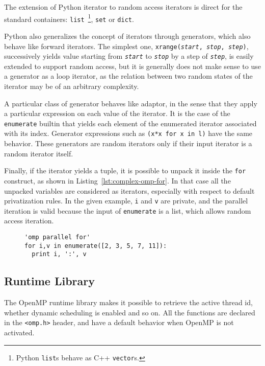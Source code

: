 \documentclass{llncs}
\begin{document}
The extension of Python iterator to random access iterators is direct for the
standard containers: \texttt{list}~\footnote{Python \texttt{list}s behave as C++
\texttt{vector}s.}, \texttt{set} or \texttt{dict}.

Python also generalizes the concept of iterators through generators, which also
behave like forward iterators. The simplest one, \texttt{xrange(\emph{start},
\emph{stop}, \emph{step})}, successively yields value starting from
\texttt\emph{start} to \texttt\emph{stop} by a step of \texttt\emph{step}, is
easily extended to support random access, but it is generally does not make
sense to use a generator as a loop iterator, as the relation between two
random states of the iterator may be of an arbitrary complexity.

A particular class of generator behaves like adaptor, in the sense that they
apply a particular expression on each value of the iterator. It is the case of
the \texttt{enumerate} builtin that yields each element of the enumerated
iterator associated with its index. Generator expressions such as \texttt{(x*x
for x in l)} have the same behavior. These generators are random iterators only
if their input iterator is a random iterator itself.

Finally, if the iterator yields a tuple, it is possible to unpack it inside the
\texttt{for} construct, as shown in Listing~\ref{lst:complex-omp-for}. In that case
all the unpacked variables are considered as iterators, especially with respect
to default privatization rules. In the given example, \texttt{i} and \texttt{v}
are private, and the parallel iteration is valid because the input of
\texttt{enumerate} is a list, which allows random access iteration.

\begin{figure}
    \begin{lstlisting}[label={lst:complex-omp-for}, caption={Parallel
    loop with tuple unpacking.}]
'omp parallel for'
for i,v in enumerate([2, 3, 5, 7, 11]):
  print i, ':', v
  \end{lstlisting}
\end{figure}

\subsection{Runtime Library}

The OpenMP runtime library makes it possible to retrieve the active thread id,
whether dynamic scheduling is enabled and so on. All the functions are declared
in the \texttt{<omp.h>} header, and have a default behavior when OpenMP is not
activated.
\end{document}
